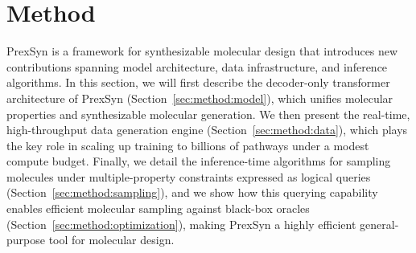 \section{Method}

PrexSyn is a framework for synthesizable molecular design that introduces new contributions spanning model architecture, data infrastructure, and inference algorithms.
In this section, we will first describe the decoder-only transformer architecture of PrexSyn (Section~\ref{sec:method:model}), which unifies molecular properties and synthesizable molecular generation.
We then present the real-time, high-throughput data generation engine (Section~\ref{sec:method:data}), which plays the key role in scaling up training to billions of pathways under a modest compute budget.
Finally, we detail the inference-time algorithms for sampling molecules under multiple-property constraints expressed as logical queries (Section~\ref{sec:method:sampling}), and we show how this querying capability enables efficient molecular sampling against black-box oracles (Section~\ref{sec:method:optimization}), making PrexSyn a highly efficient general-purpose tool for molecular design.

